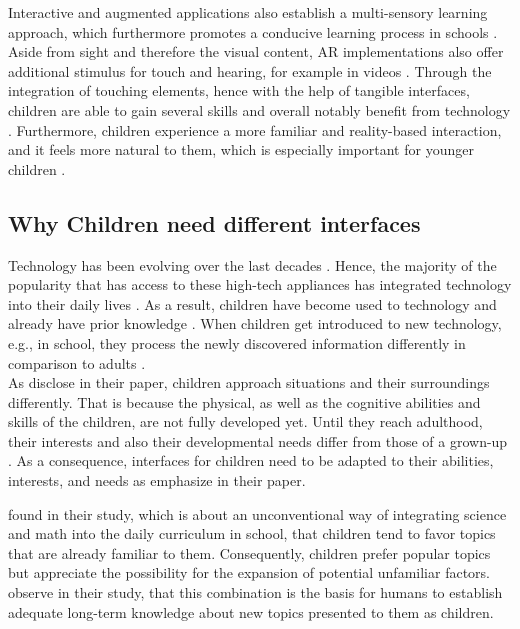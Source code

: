 Interactive and augmented applications also establish a multi-sensory learning approach, which furthermore promotes a conducive learning process in schools \autocite{cabero2016educational}. Aside from sight and therefore the visual content, AR implementations also offer additional stimulus for touch and hearing, for example in videos \autocite{saidin2015review, cabero2016educational, lozano2016dedigitalizing}. Through the integration of touching elements, hence with the help of tangible interfaces, children are able to gain several skills and overall notably benefit from technology \autocite{saidin2015review, cabero2016educational}. Furthermore, children experience a more familiar and reality-based interaction, and it feels more natural to them, which is especially important for younger children \autocite{lozano2016dedigitalizing}.

\subsection{Why Children need different interfaces}
\label{subsection:ChildrenInterfaces}
Technology has been evolving over the last decades \autocite{walker2000screen}. Hence, the majority of the popularity that has access to these high-tech appliances has integrated technology into their daily lives \autocite{sharmin2012effect, walker2000screen}. As a result, children have become used to technology and already have prior knowledge \autocite{walker2000screen, gikas2013mobile}. When children get introduced to new technology, e.g., in school, they process the newly discovered information differently in comparison to adults \autocite{gossen2012search}. \\
As \textcite{alhussayen2015evaluating} disclose in their paper, children approach situations and their surroundings differently. That is because the physical, as well as the cognitive abilities and skills of the children, are not fully developed yet. Until they reach adulthood, their interests and also their developmental needs differ from those of a grown-up \autocite{gossen2012search, alhussayen2015evaluating}. As a consequence, interfaces for children need to be adapted to their abilities, interests, and needs as \textcite{gossen2012search} emphasize in their paper.

\textcite{kermani2015preparing} found in their study, which is about an unconventional way of integrating science and math into the daily curriculum in school, that children tend to favor topics that are already familiar to them. Consequently, children prefer popular topics but appreciate the possibility for the expansion of potential unfamiliar factors. \textcite{kermani2015preparing} observe in their study, that this combination is the basis for humans to establish adequate long-term knowledge about new topics presented to them as children.

